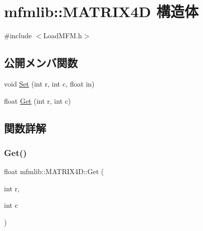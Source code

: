 \hypertarget{structmfmlib_1_1_m_a_t_r_i_x4_d}{}\section{mfmlib\+:\+:M\+A\+T\+R\+I\+X4D 構造体}
\label{structmfmlib_1_1_m_a_t_r_i_x4_d}


{\ttfamily \#include $<$Load\+M\+F\+M.\+h$>$}

\subsection*{公開メンバ関数}
\begin{DoxyCompactItemize}
\item 
void \mbox{\hyperlink{structmfmlib_1_1_m_a_t_r_i_x4_d_a9401e25debd929fe663fd36c8fbdba1e}{Set}} (int r, int c, float in)
\item 
float \mbox{\hyperlink{structmfmlib_1_1_m_a_t_r_i_x4_d_a2e680fda9f3159b6ebfa1ce7c842ef48}{Get}} (int r, int c)
\end{DoxyCompactItemize}


\subsection{関数詳解}
\mbox{\label{structmfmlib_1_1_m_a_t_r_i_x4_d_a2e680fda9f3159b6ebfa1ce7c842ef48}} 
\subsubsection{\texorpdfstring{Get()}{Get()}}
{\footnotesize\ttfamily float mfmlib\+::\+M\+A\+T\+R\+I\+X4\+D\+::\+Get (\begin{DoxyParamCaption}\item[{int}]{r,  }\item[{int}]{c }\end{DoxyParamCaption})\hspace{0.3cm}{\ttfamily [inline]}}

\mbox{\label{structmfmlib_1_1_m_a_t_r_i_x4_d_a9401e25debd929fe663fd36c8fbdba1e}} 
